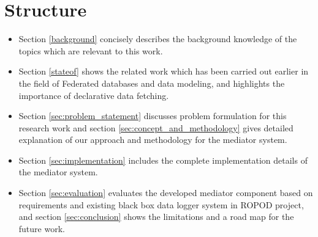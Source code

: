     \section{Structure}
	
		\begin{itemize}
			\item Section \ref{background} concisely describes the background knowledge of the topics which are relevant to this work.
			\item Section \ref{stateof} shows the related work which has been carried out earlier in the field of Federated databases and data modeling, and highlights the importance of declarative data fetching.
			\item Section \ref{sec:problem_statement} discusses problem formulation for this research work and section \ref{sec:concept_and_methodology} gives detailed explanation of our approach and methodology for the mediator system.
			\item Section \ref{sec:implementation} includes the complete implementation details of the mediator system.
			\item Section \ref{sec:evaluation} evaluates the developed mediator component based on requirements and existing black box data logger system in ROPOD project, and section \ref{sec:conclusion} shows the limitations and a road map for the future work. 
		\end{itemize}

\let\cleardoublepage\clearpage


